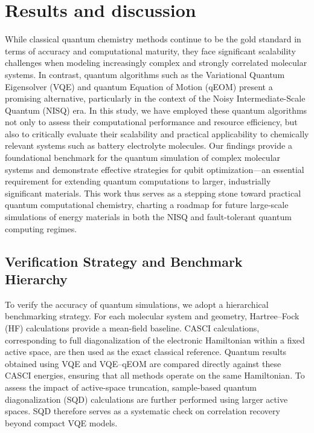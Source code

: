 \documentclass[num-refs]{wiley-article}
\begin{document}
\section{Results and discussion}
While classical quantum chemistry methods continue to be the gold standard in terms of accuracy and computational maturity, they face significant scalability challenges when modeling increasingly complex and strongly correlated molecular systems. In contrast, quantum algorithms such as the Variational Quantum Eigensolver (VQE) and quantum Equation of Motion (qEOM) present a promising alternative, particularly in the context of the Noisy Intermediate-Scale Quantum (NISQ) era. In this study, we have employed these quantum algorithms not only to assess their computational performance and resource efficiency, but also to critically evaluate their scalability and practical applicability to chemically relevant systems such as battery electrolyte molecules. Our findings provide a foundational benchmark for the quantum simulation of complex molecular systems and demonstrate effective strategies for qubit optimization—an essential requirement for extending quantum computations to larger, industrially significant materials. This work thus serves as a stepping stone toward practical quantum computational chemistry, charting a roadmap for future large-scale simulations of energy materials in both the NISQ and fault-tolerant quantum computing regimes.

\subsection{Verification Strategy and Benchmark Hierarchy}

To verify the accuracy of quantum simulations, we adopt a hierarchical benchmarking 
strategy. For each molecular system and geometry, Hartree--Fock (HF) calculations 
provide a mean-field baseline. CASCI calculations, corresponding to full 
diagonalization of the electronic Hamiltonian within a fixed active space, are then 
used as the exact classical reference. Quantum results obtained using VQE and 
VQE--qEOM are compared directly against these CASCI energies, ensuring that all 
methods operate on the same Hamiltonian. To assess the impact of active-space truncation, sample-based quantum diagonalization (SQD) calculations are further performed using larger active spaces. SQD therefore serves as a systematic check on correlation recovery beyond compact VQE models. %
\end{document}
